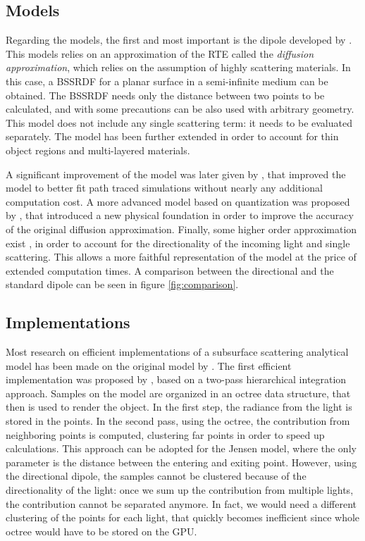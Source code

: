 \subsection{Models}
Regarding the models, the first and most important is the dipole developed by \cite{Jensen:2001:PMS:383259.383319}. This models relies on an approximation of the RTE called the \emph{diffusion approximation}, which relies on the assumption of highly scattering materials. In this case, a BSSRDF for a planar surface in a semi-infinite medium can be obtained. The BSSRDF needs only the distance between two points to be calculated, and with some precautions can be also used with arbitrary geometry. This model does not include any single scattering term: it needs to be evaluated separately. The model has been further extended in order to account for thin object regions and multi-layered materials\citep{Donner:2005:LDM:1186822.1073308}.

A significant improvement of the model was later given by \cite{deondeon}, that improved the model to better fit path traced simulations without nearly any additional computation cost. A more advanced model based on quantization was proposed by \cite{D'Eon:2011:QMR:1964921.1964951}, that introduced a new physical foundation in order to improve the accuracy of the original diffusion approximation. Finally, some higher order approximation exist \citep{IMM2013-06646}, in order to account for the directionality of the incoming light and single scattering. This allows a more faithful representation of the model at the price of extended computation times. A comparison between the directional and the standard dipole can be seen in figure \ref{fig:comparison}.


\subsection{Implementations}

Most research on efficient implementations of a subsurface scattering analytical model has been made on the original model by \cite{Jensen:2001:PMS:383259.383319}. The first efficient implementation was proposed by \cite{Jensen:2002:RHR:566654.566619}, based on a two-pass hierarchical integration approach. Samples on the model are organized in an octree data structure, that then is used to render the object. In the first step, the radiance from the light is stored in the points. In the second pass, using the octree, the contribution from neighboring points is computed, clustering far points in order to speed up calculations. This approach can be adopted for the Jensen model, where the only parameter is the distance between the entering and exiting point. However, using the directional dipole, the samples cannot be clustered because of the directionality of the light: once we sum up the contribution from multiple lights, the contribution cannot be separated anymore. In fact, we would need a different clustering of the points for each light, that quickly becomes inefficient since whole octree would have to be stored on the GPU. 

